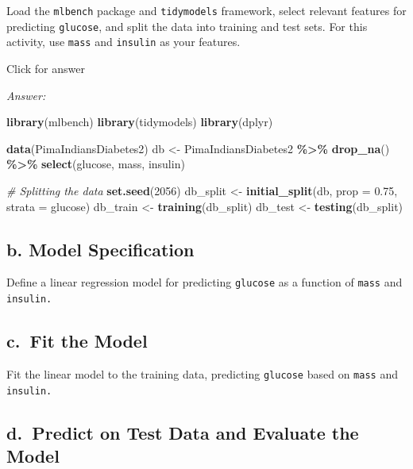 \documentclass[
]{book}
\newenvironment{Shaded}{\begin{snugshade}}{\end{snugshade}}
\newcommand{\AttributeTok}[1]{\textcolor[rgb]{0.13,0.29,0.53}{#1}}
\newcommand{\CommentTok}[1]{\textcolor[rgb]{0.56,0.35,0.01}{\textit{#1}}}
\newcommand{\DecValTok}[1]{\textcolor[rgb]{0.00,0.00,0.81}{#1}}
\newcommand{\FloatTok}[1]{\textcolor[rgb]{0.00,0.00,0.81}{#1}}
\newcommand{\FunctionTok}[1]{\textcolor[rgb]{0.13,0.29,0.53}{\textbf{#1}}}
\newcommand{\NormalTok}[1]{#1}
\newcommand{\OtherTok}[1]{\textcolor[rgb]{0.56,0.35,0.01}{#1}}
\newcommand{\SpecialCharTok}[1]{\textcolor[rgb]{0.81,0.36,0.00}{\textbf{#1}}}
\begin{document}
Load the \texttt{mlbench} package and \texttt{tidymodels} framework, select relevant features for predicting \texttt{glucose}, and split the data into training and test sets. For this activity, use \texttt{mass} and \texttt{insulin} as your features.

Click for answer

\emph{Answer:}

\begin{Shaded}
\begin{Highlighting}[]
\FunctionTok{library}\NormalTok{(mlbench)}
\FunctionTok{library}\NormalTok{(tidymodels)}
\FunctionTok{library}\NormalTok{(dplyr)}

\FunctionTok{data}\NormalTok{(PimaIndiansDiabetes2)}
\NormalTok{db }\OtherTok{\textless{}{-}}\NormalTok{ PimaIndiansDiabetes2 }\SpecialCharTok{\%\textgreater{}\%} 
  \FunctionTok{drop\_na}\NormalTok{() }\SpecialCharTok{\%\textgreater{}\%}
  \FunctionTok{select}\NormalTok{(glucose, mass, insulin)}

\CommentTok{\# Splitting the data}
\FunctionTok{set.seed}\NormalTok{(}\DecValTok{2056}\NormalTok{)}
\NormalTok{db\_split }\OtherTok{\textless{}{-}} \FunctionTok{initial\_split}\NormalTok{(db, }\AttributeTok{prop =} \FloatTok{0.75}\NormalTok{, }\AttributeTok{strata =}\NormalTok{ glucose)}
\NormalTok{db\_train }\OtherTok{\textless{}{-}} \FunctionTok{training}\NormalTok{(db\_split)}
\NormalTok{db\_test }\OtherTok{\textless{}{-}} \FunctionTok{testing}\NormalTok{(db\_split)}
\end{Highlighting}
\end{Shaded}

\hypertarget{b.-model-specification}{%
\subsection{b. Model Specification}\label{b.-model-specification}}

Define a linear regression model for predicting \texttt{glucose} as a function of \texttt{mass} and \texttt{insulin.}

\hypertarget{c.-fit-the-model}{%
\subsection{c.~Fit the Model}\label{c.-fit-the-model}}

Fit the linear model to the training data, predicting \texttt{glucose} based on \texttt{mass} and \texttt{insulin.}

\hypertarget{d.-predict-on-test-data-and-evaluate-the-model}{%
\subsection{d.~Predict on Test Data and Evaluate the Model}\label{d.-predict-on-test-data-and-evaluate-the-model}}
\end{document}
